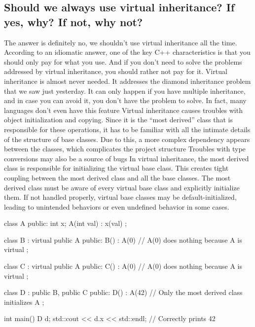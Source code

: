 \documentclass{report}
\begin{document}
\subsection{Should we always use virtual inheritance? If yes, why? If not, why not?}
\bigbreak \noindent 
The answer is definitely no, we shouldn’t use virtual inheritance
all the time. According to an idiomatic answer, one of the key
C++ characteristics is that you should only pay for what you use.
And if you don’t need to solve the problems addressed by virtual
inheritance, you should rather not pay for it.
\bigbreak \noindent 
Virtual inheritance is almost never needed. It addresses the diamond inheritance problem that we saw just yesterday. It can only
happen if you have multiple inheritance, and in case you can avoid
it, you don’t have the problem to solve. In fact, many languages
don’t even have this feature
\bigbreak \noindent 
Virtual inheritance causes troubles with object initialization and
copying. Since it is the “most derived” class that is responsible
for these operations, it has to be familiar with all the intimate
details of the structure of base classes. Due to this, a more complex
dependency appears between the classes, which complicates the
project structure
\bigbreak \noindent 
Troubles with type conversions may also be a source of bugs
\bigbreak \noindent 
In virtual inheritance, the most derived class is responsible for initializing the virtual base class. This creates tight coupling between the most derived class and all the base classes. The most derived class must be aware of every virtual base class and explicitly initialize them. If not handled properly, virtual base classes may be default-initialized, leading to unintended behaviors or even undefined behavior in some cases.
\bigbreak \noindent 
\begin{cppcode}
    class A {
        public:
        int x;
        A(int val) : x(val) {}
    };

    class B : virtual public A {
        public:
        B() : A(0) {}  // A(0) does nothing because A is virtual
    };

    class C : virtual public A {
        public:
        C() : A(0) {}  // A(0) does nothing because A is virtual
    };

    class D : public B, public C {
        public:
        D() : A(42) {}  // Only the most derived class initializes A
    };

    int main() {
        D d;
        std::cout << d.x << std::endl;  // Correctly prints 42
    }
\end{cppcode}
\end{document}
